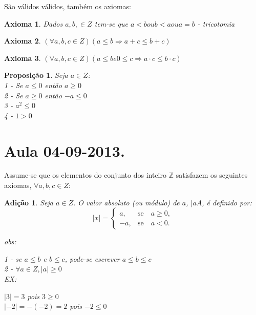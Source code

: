 \documentclass[a4paper,12pt]{article}
\newtheorem{add_int}{Adição}
\newtheorem{prop_int}{Proposição}
\newtheorem{ax}{Axioma}
\begin{document}

São válidos válidos, também os axiomas:

\begin{ax}
  Dados $a, b, \in Z$ tem-se que $a < b ou b < a ou a = b$ - tricotomia
\end{ax}

\begin{ax}
  $(\forall a, b, c \in Z)(a \leq b \Longrightarrow a + c \leq b + c)$
\end{ax}
\begin{ax}
  $(\forall a, b, c \in Z)(a \leq b e 0 \leq c \Longrightarrow a \cdot c \leq b \cdot c)$
\end{ax}

\begin{prop_int} %
  Seja $a \in Z$:\\
  1 - Se $a \leq 0$ então $a \geq 0$\\
  2 - Se $a \geq 0$ então $-a \leq 0$\\
  3 - $a^2 \leq 0$\\
  4 - $1 > 0$\\
\end{prop_int}

\section{Aula 04-09-2013.}

Assume-se que os elementos do conjunto dos inteiro $\mathbb{Z}$ satisfazem os seguintes axiomas, $\forall a, b, c \in Z$:

\begin{add_int} %
  Seja $a \in Z$. O valor absoluto (ou módulo) de $a$, $|aA$, é definido por:\\
  $$
  |x|=\left\{
    \begin{array}{rc}
      a,&\mbox{se}\quad a\ge 0,\\
      -a, &\mbox{se}\quad a<0.
    \end{array}\right.
  $$

obs:

1 - se $a \leq b$ e $b \leq c$, pode-se escrever $a \leq b \leq c$\\
2 - $\forall a \in Z, |a| \ge 0$\\

EX:

$|3| = 3$ pois $3 \geq 0$\\
$|-2| = -(-2) = 2$ pois $-2 \leq 0$
\end{add_int}
\end{document}
